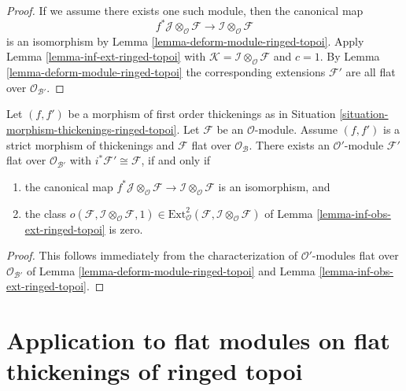 \begin{proof}
If we assume there exists one such module, then the canonical map
$$
f^*\mathcal{J} \otimes_\mathcal{O} \mathcal{F} \to
\mathcal{I} \otimes_\mathcal{O} \mathcal{F}
$$
is an isomorphism by Lemma \ref{lemma-deform-module-ringed-topoi}. Apply
Lemma \ref{lemma-inf-ext-ringed-topoi} with $\mathcal{K} = 
\mathcal{I} \otimes_\mathcal{O} \mathcal{F}$
and $c = 1$. By Lemma \ref{lemma-deform-module-ringed-topoi}
the corresponding extensions
$\mathcal{F}'$ are all flat over $\mathcal{O}_{\mathcal{B}'}$.
\end{proof}

\begin{lemma}
\label{lemma-inf-obs-ext-rel-ringed-topoi}
Let $(f, f')$ be a morphism of first order thickenings as in
Situation \ref{situation-morphism-thickenings-ringed-topoi}.
Let $\mathcal{F}$ be an $\mathcal{O}$-module. Assume
$(f, f')$ is a strict morphism of thickenings
and $\mathcal{F}$ flat over $\mathcal{O}_\mathcal{B}$. There exists an
$\mathcal{O}'$-module $\mathcal{F}'$ flat over $\mathcal{O}_{\mathcal{B}'}$
with $i^*\mathcal{F}' \cong \mathcal{F}$, if and only if
\begin{enumerate}
\item the canonical map
$f^*\mathcal{J} \otimes_\mathcal{O} \mathcal{F} \to
\mathcal{I} \otimes_\mathcal{O} \mathcal{F}$
is an isomorphism, and
\item the class
$o(\mathcal{F}, \mathcal{I} \otimes_\mathcal{O} \mathcal{F}, 1)
\in \text{Ext}^2_\mathcal{O}(
\mathcal{F}, \mathcal{I} \otimes_\mathcal{O} \mathcal{F})$
of Lemma \ref{lemma-inf-obs-ext-ringed-topoi} is zero.
\end{enumerate}
\end{lemma}

\begin{proof}
This follows immediately from the characterization of
$\mathcal{O}'$-modules flat over $\mathcal{O}_{\mathcal{B}'}$ of 
Lemma \ref{lemma-deform-module-ringed-topoi} and
Lemma \ref{lemma-inf-obs-ext-ringed-topoi}.
\end{proof}






\section{Application to flat modules on flat thickenings of ringed topoi}
\label{section-flat-ringed-topoi}

